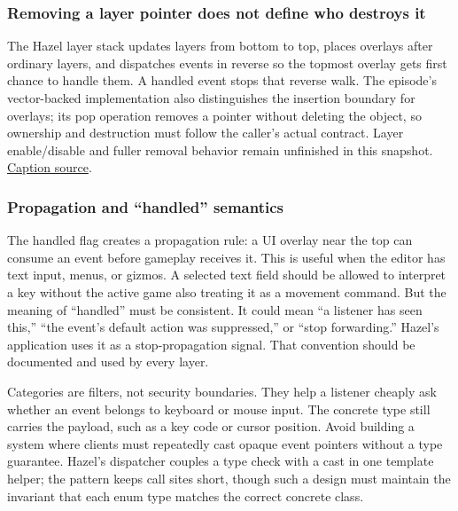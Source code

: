 \subsubsection{Removing a layer pointer does not define who destroys it}\label{05-engine-i-ch013-removing-a-layer-pointer-does-not-define-who-destroys-it}

\hypertarget{05-engine-i-ch013-removing-a-layer-pointer-does-not-define-who-destroys-it}{}

The Hazel layer stack updates layers from bottom to top, places overlays after ordinary layers, and dispatches events in reverse so the topmost overlay gets first chance to handle them. A handled event stops that reverse walk. The episode's vector-backed implementation also distinguishes the insertion boundary for overlays; its pop operation removes a pointer without deleting the object, so ownership and destruction must follow the caller's actual contract. Layer enable/disable and fuller removal behavior remain unfinished in this snapshot. \href{https://www.youtube.com/watch?v=_Kj6BSfM6P4}{Caption source}.

\subsubsection{Propagation and ``handled'' semantics}\label{05-engine-i-ch013-propagation-and-handled-semantics}

\hypertarget{05-engine-i-ch013-propagation-and-handled-semantics}{}

The handled flag creates a propagation rule: a UI overlay near the top can consume an event before gameplay receives it. This is useful when the editor has text input, menus, or gizmos. A selected text field should be allowed to interpret a key without the active game also treating it as a movement command. But the meaning of ``handled'' must be consistent. It could mean ``a listener has seen this,'' ``the event's default action was suppressed,'' or ``stop forwarding.'' Hazel's application uses it as a stop-propagation signal. That convention should be documented and used by every layer.

Categories are filters, not security boundaries. They help a listener cheaply ask whether an event belongs to keyboard or mouse input. The concrete type still carries the payload, such as a key code or cursor position. Avoid building a system where clients must repeatedly cast opaque event pointers without a type guarantee. Hazel's dispatcher couples a type check with a cast in one template helper; the pattern keeps call sites short, though such a design must maintain the invariant that each enum type matches the correct concrete class.

